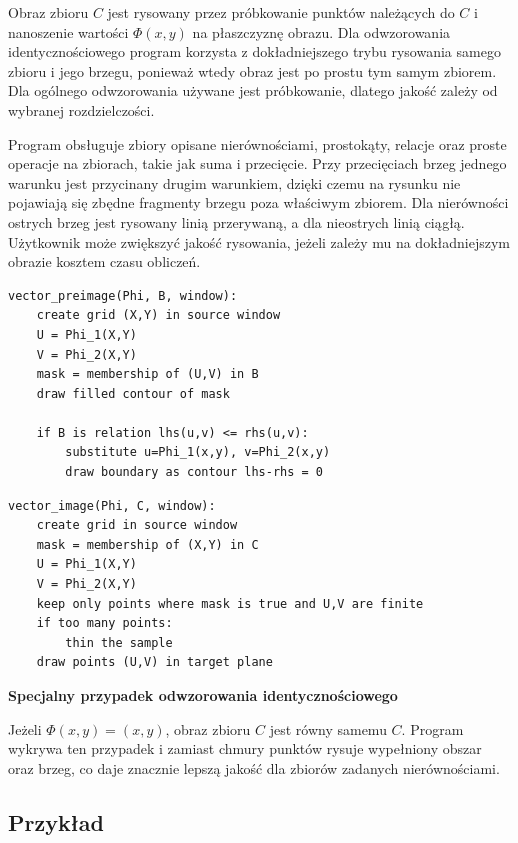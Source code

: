 \documentclass[12pt,a4paper]{article}
\newcommand{\plainnote}[2]{%
\par\medskip
\noindent\begin{minipage}{0.94\linewidth}
\textbf{#1}\par\smallskip
#2
\end{minipage}
\par\medskip
}
\newcommand{\techbox}[2]{\plainnote{#1}{#2}}
\begin{document}
Obraz zbioru $C$ jest rysowany przez próbkowanie punktów należących do $C$ i nanoszenie wartości $\Phi(x,y)$ na płaszczyznę obrazu. Dla odwzorowania identycznościowego program korzysta z dokładniejszego trybu rysowania samego zbioru i jego brzegu, ponieważ wtedy obraz jest po prostu tym samym zbiorem. Dla ogólnego odwzorowania używane jest próbkowanie, dlatego jakość zależy od wybranej rozdzielczości.

Program obsługuje zbiory opisane nierównościami, prostokąty, relacje oraz proste operacje na zbiorach, takie jak suma i przecięcie. Przy przecięciach brzeg jednego warunku jest przycinany drugim warunkiem, dzięki czemu na rysunku nie pojawiają się zbędne fragmenty brzegu poza właściwym zbiorem. Dla nierówności ostrych brzeg jest rysowany linią przerywaną, a dla nieostrych linią ciągłą. Użytkownik może zwiększyć jakość rysowania, jeżeli zależy mu na dokładniejszym obrazie kosztem czasu obliczeń.

\begin{lstlisting}[style=pseudo,caption={Przeciwobraz w module odwzorowań wektorowych}]
vector_preimage(Phi, B, window):
    create grid (X,Y) in source window
    U = Phi_1(X,Y)
    V = Phi_2(X,Y)
    mask = membership of (U,V) in B
    draw filled contour of mask

    if B is relation lhs(u,v) <= rhs(u,v):
        substitute u=Phi_1(x,y), v=Phi_2(x,y)
        draw boundary as contour lhs-rhs = 0
\end{lstlisting}

\begin{lstlisting}[style=pseudo,caption={Obraz zbioru w module odwzorowań wektorowych}]
vector_image(Phi, C, window):
    create grid in source window
    mask = membership of (X,Y) in C
    U = Phi_1(X,Y)
    V = Phi_2(X,Y)
    keep only points where mask is true and U,V are finite
    if too many points:
        thin the sample
    draw points (U,V) in target plane
\end{lstlisting}

\techbox{Specjalny przypadek odwzorowania identycznościowego}{
Jeżeli $\Phi(x,y)=(x,y)$, obraz zbioru $C$ jest równy samemu $C$. Program wykrywa ten przypadek i zamiast chmury punktów rysuje wypełniony obszar oraz brzeg, co daje znacznie lepszą jakość dla zbiorów zadanych nierównościami.
}

\subsection{Przykład}
\end{document}
